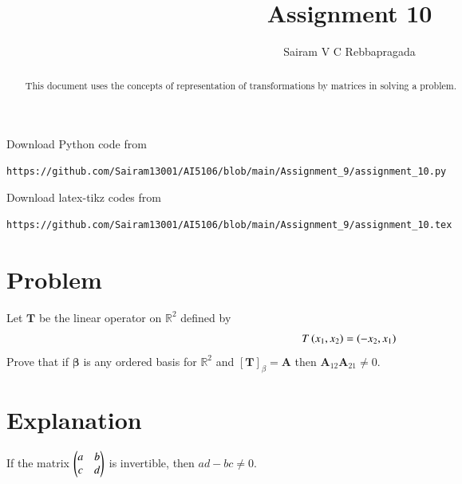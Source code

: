 \documentclass[journal,12pt,twocolumn]{IEEEtran}
\begin{document}
\makeatletter
{}
\makeatother
\let\StandardTheFigure\thefigure
\let\vec\mathbf
\renewcommand{\thefigure}{\theproblem}
\def\putbox#1#2#3{\makebox[0in][l]{\makebox[#1][l]{}\raisebox{\baselineskip}[0in][0in]{\raisebox{#2}[0in][0in]{#3}}}}
     \def\rightbox#1{\makebox[0in][r]{#1}}
     \def\centbox#1{\makebox[0in]{#1}}
     \def\topbox#1{\raisebox{-\baselineskip}[0in][0in]{#1}}
     \def\midbox#1{\raisebox{-0.5\baselineskip}[0in][0in]{#1}}
\vspace{3cm}
\title{Assignment 10}
\author{Sairam V C Rebbapragada}
\maketitle
\newpage
\bigskip
\renewcommand{\thefigure}{\theenumi}
\renewcommand{\thetable}{\theenumi}
\begin{abstract}
This document uses the concepts of representation of transformations by matrices in solving a problem.
\end{abstract}
Download Python code from 
%
\begin{lstlisting}
https://github.com/Sairam13001/AI5106/blob/main/Assignment_9/assignment_10.py
\end{lstlisting}
%
Download latex-tikz codes from 
%
\begin{lstlisting}
https://github.com/Sairam13001/AI5106/blob/main/Assignment_9/assignment_10.tex
\end{lstlisting}
%

\section{Problem}

Let $\mathbf{T}$ be the linear operator on $\mathbb{R}^2$ defined by
\begin{align}
    T\left(x_1, x_2\right) = \left(-x_2, x_1\right) \label{given_lin_op}
\end{align}
Prove that if $\vec{\beta}$ is any ordered basis for $\mathbb{R}^2$ and $[\vec{T}]_\beta = \vec{A}$ then $\vec{A}_{12}\vec{A}_{21} \neq 0$.  

\section{Explanation}
If the matrix $\begin{pmatrix}a & b \\ c & d\end{pmatrix}$ is invertible, then $ad-bc \neq 0$. 
\end{document}
